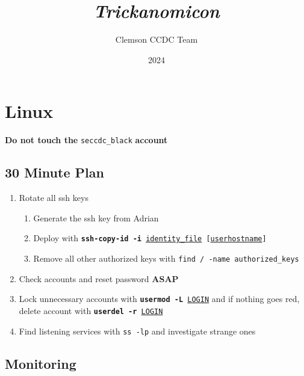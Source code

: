 \documentclass[12pt,letterpaper]{article}
\title{\color{iris}\huge{\bf{\it{Trickanomicon}}}}
\author{\color{muted}Clemson CCDC Team}
\date{\color{subtle}2024}
\def\code#1{\textcolor{iris}{\texttt{#1}}}
\def\bf#1{\textbf{#1}}
\def\ul#1{\underline{#1}}
\begin{document}
\maketitle

\pagebreak

\tableofcontents

\pagebreak

\section{Linux}

\bf{Do not touch the} \code{seccdc\_black} \bf{account}

\subsection{30 Minute Plan}

\begin{enumerate}
	\item Rotate all ssh keys
		\begin{enumerate}
			\item Generate the ssh key from Adrian
			\item Deploy with \code{\bf{ssh-copy-id -i} \ul{identity\_file} [\ul{user}\@\ul{hostname}]}
			\item Remove all other authorized keys with \code{find / -name authorized\_keys}
		\end{enumerate}
	\item Check accounts and reset password \bf{ASAP}
	\item Lock unnecessary accounts with \code{\bf{usermod -L} \ul{LOGIN}} and if nothing goes red, delete account with \code{\bf{userdel -r} \ul{LOGIN}}
	\item Find listening services with \code{ss -lp} and investigate strange ones
\end{enumerate}

\subsection{Monitoring}
\end{document}

